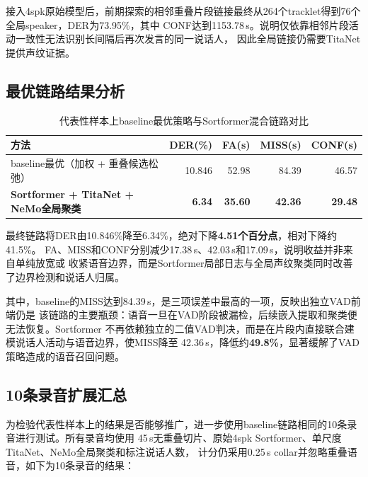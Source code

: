 \documentclass[UTF8,a4paper,10pt]{ctexart}
\begin{document}
接入4spk原始模型后，前期探索的相邻重叠片段链接最终从264个tracklet得到76个全局speaker，DER为73.95\%，其中
CONF达到1153.78\,s。说明仅依靠相邻片段活动一致性无法识别长间隔后再次发言的同一说话人，
因此全局链接仍需要TitaNet提供声纹证据。

\subsection{最优链路结果分析}


\begin{table}[H]
\centering
\small
\caption{代表性样本上baseline最优策略与Sortformer混合链路对比}
\label{tab:sortformer-main}
\begin{tabular}{lrrrr}
\toprule
方法 & DER(\%) & FA(s)& MISS(s)& CONF(s)\\
\midrule
baseline最优（加权 + 重叠候选松弛） & 10.846 & 52.98 & 84.39 &46.57 \\
\textbf{Sortformer + TitaNet + NeMo全局聚类} & \textbf{6.34} & \textbf{35.60} & \textbf{42.36} & \textbf{29.48}\\
\bottomrule
\end{tabular}
\end{table}

最终链路将DER由10.846\%降至6.34\%，绝对下降\textbf{4.51个百分点}，相对下降约41.5\%。
FA、MISS和CONF分别减少17.38\,s、42.03\,s和17.09\,s，说明收益并非来自单纯放宽或
收紧语音边界，而是Sortformer局部日志与全局声纹聚类同时改善了边界检测和说话人归属。

其中，baseline的MISS达到84.39\,s，是三项误差中最高的一项，反映出独立VAD前端仍是
该链路的主要瓶颈：语音一旦在VAD阶段被漏检，后续嵌入提取和聚类便无法恢复。Sortformer
不再依赖独立的二值VAD判决，而是在片段内直接联合建模说话人活动与语音边界，使MISS降至
42.36\,s，降低约\textbf{49.8\%}，显著缓解了VAD策略造成的语音召回问题。


\subsection{10条录音扩展汇总}

为检验代表性样本上的结果是否能够推广，进一步使用baseline链路相同的10条录音进行测试。所有录音均使用
45\,s无重叠切片、原始4spk Sortformer、单尺度TitaNet、NeMo全局聚类和标注说话人数，
计分仍采用0.25\,s collar并忽略重叠语音，如下为10条录音的结果：
\end{document}
